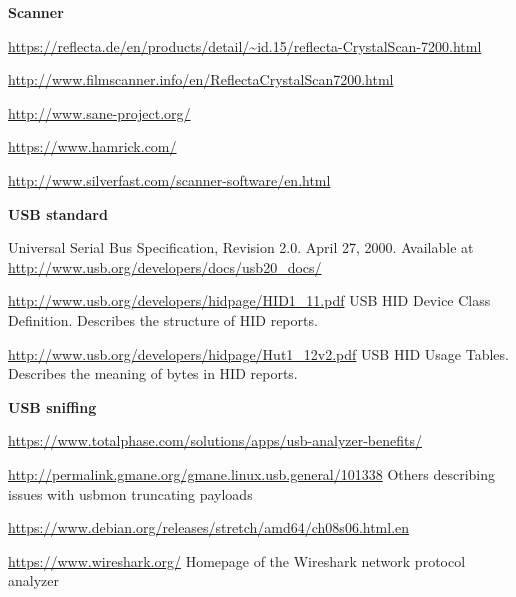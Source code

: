 \documentclass{article}
\begin{document}
\renewcommand{\refname}{Links}
\begin{thebibliography}{}
  \setcounter{enumiv}{\value{firstbib}}
  \item[]\hspace{-\labelwidth}\hspace{-\labelsep}\textbf{Scanner}
  
  \url{https://reflecta.de/en/products/detail/~id.15/reflecta-CrystalScan-7200.html}
  
  \url{http://www.filmscanner.info/en/ReflectaCrystalScan7200.html}
  
  \url{http://www.sane-project.org/}
  
  \url{https://www.hamrick.com/}
  
  \url{http://www.silverfast.com/scanner-software/en.html}
  
  \item[]\hspace{-\labelwidth}\hspace{-\labelsep}\textbf{USB standard}
  
   Universal Serial Bus Specification, Revision 2.0.
                   April 27, 2000. Available at
                   \url{http://www.usb.org/developers/docs/usb20_docs/}

  \url{http://www.usb.org/developers/hidpage/HID1_11.pdf}
  USB HID Device Class Definition. Describes the structure of HID reports.
  
  \url{http://www.usb.org/developers/hidpage/Hut1_12v2.pdf}
  USB HID Usage Tables. Describes the meaning of bytes in HID reports.

  \item[]\hspace{-\labelwidth}\hspace{-\labelsep}\textbf{USB sniffing}


  \url{https://www.totalphase.com/solutions/apps/usb-analyzer-benefits/}

  \url{http://permalink.gmane.org/gmane.linux.usb.general/101338}
  Others describing issues with {\it} usbmon truncating payloads
  
  \url{https://www.debian.org/releases/stretch/amd64/ch08s06.html.en}

  \url{https://www.wireshark.org/}
  Homepage of the Wireshark network protocol analyzer
  

\end{thebibliography}
\end{document}
